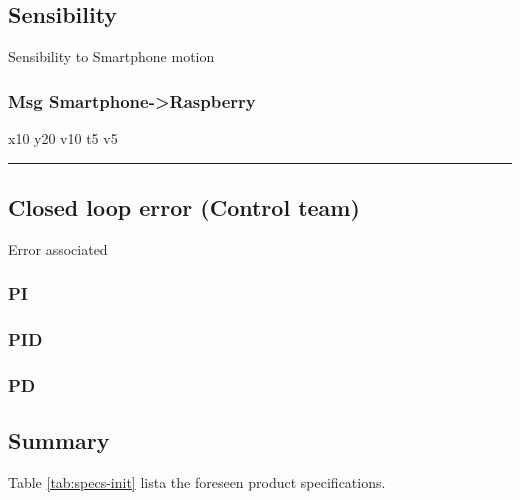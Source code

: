 \subsection{Sensibility}
\label{sec:org622e63a}
Sensibility to Smartphone motion
\subsubsection{Msg Smartphone->Raspberry}
\label{sec:org6b5cb97}
x10 y20 v10
t5 v5

\noindent\rule{\textwidth}{0.5pt}
\subsection{Closed loop error (Control team)}
\label{sec:org436f732}
Error associated
\subsubsection{PI}
\label{sec:org9859444}
\subsubsection{PID}
\label{sec:org352c4d4}
\subsubsection{PD}
\label{sec:org0d324c4}

\subsection{Summary}
\label{sec:org1f95256}
Table \ref{tab:specs-init} lista the foreseen product specifications.

